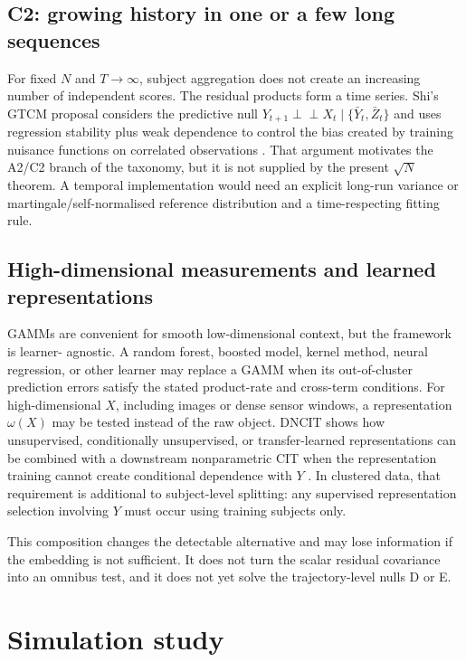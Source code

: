 \documentclass[11pt]{article}
\theoremstyle{definition}
\newcommand{\indep}{\perp\!\!\!\perp}
\begin{document}
\subsection{C2: growing history in one or a few long sequences}

For fixed $N$ and $T\to\infty$, subject aggregation does not create an increasing number of
independent scores. The residual products form a time series. Shi's GTCM proposal considers
the predictive null $Y_{t+1}\indep X_t\mid\{\bar Y_t,\bar Z_t\}$ and uses regression
stability plus weak dependence to control the bias created by training nuisance functions on
correlated observations \cite{shi2025}. That argument motivates the A2/C2 branch of the
taxonomy, but it is not supplied by the present $\sqrt N$ theorem. A temporal implementation
would need an explicit long-run variance or martingale/self-normalised reference distribution
and a time-respecting fitting rule.

\subsection{High-dimensional measurements and learned representations}

GAMMs are convenient for smooth low-dimensional context, but the framework is learner-
agnostic. A random forest, boosted model, kernel method, neural regression, or other learner
may replace a GAMM when its out-of-cluster prediction errors satisfy the stated product-rate
and cross-term conditions. For high-dimensional $X$, including images or dense sensor
windows, a representation $\omega(X)$ may be tested instead of the raw object. DNCIT shows
how unsupervised, conditionally unsupervised, or transfer-learned representations can be
combined with a downstream nonparametric CIT when the representation training cannot create
conditional dependence with $Y$ \cite{simnacher2024}. In clustered data, that requirement is
additional to subject-level splitting: any supervised representation selection involving
$Y$ must occur using training subjects only.

This composition changes the detectable alternative and may lose information if the
embedding is not sufficient. It does not turn the scalar residual covariance into an omnibus
test, and it does not yet solve the trajectory-level nulls D or E.

\section{Simulation study}
\end{document}
